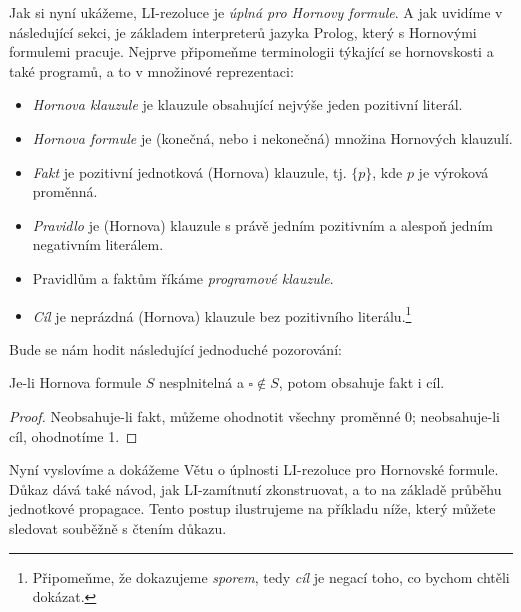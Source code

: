 Jak si nyní ukážeme, LI-rezoluce je \emph{úplná pro Hornovy formule}. A jak uvidíme v následující sekci, je základem interpreterů jazyka Prolog, který s Hornovými formulemi pracuje. Nejprve připomeňme terminologii týkající se hornovskosti a také programů, a to v množinové reprezentaci:

\begin{itemize}
    \item \emph{Hornova klauzule} je klauzule obsahující nejvýše jeden pozitivní literál.
    \item \emph{Hornova formule} je (konečná, nebo i nekonečná) množina Hornových klauzulí.
    \item \emph{Fakt} je pozitivní jednotková (Hornova) klauzule, tj. $\{p\}$, kde $p$ je výroková proměnná.
    \item \emph{Pravidlo} je (Hornova) klauzule s právě jedním pozitivním a alespoň jedním negativním literálem.
    \item Pravidlům a faktům říkáme \emph{programové klauzule}.
    \item \emph{Cíl} je neprázdná (Hornova) klauzule bez pozitivního literálu.\footnote{Připomeňme, že dokazujeme \emph{sporem}, tedy \emph{cíl} je negací toho, co bychom chtěli dokázat.}
\end{itemize}

Bude se nám hodit následující jednoduché pozorování:

\begin{observation}\label{observation:horn-fact-goal}
    Je-li Hornova formule $S$ nesplnitelná a $\square\notin S$, potom obsahuje fakt i cíl.
\end{observation}
\begin{proof}
    Neobsahuje-li fakt, můžeme ohodnotit všechny proměnné 0; neobsahuje-li cíl, ohodnotíme 1.
\end{proof}

Nyní vyslovíme a dokážeme Větu o úplnosti LI-rezoluce pro Hornovské formule. Důkaz dává také návod, jak LI-zamítnutí zkonstruovat, a to na základě průběhu jednotkové propagace. Tento postup ilustrujeme na příkladu níže, který můžete sledovat souběžně s čtením důkazu.

